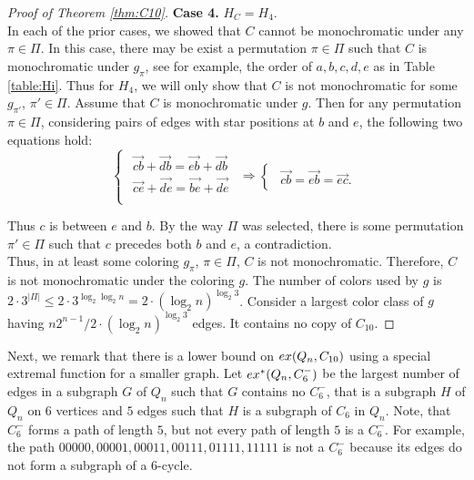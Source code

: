 \documentclass[11pt, a4paper]{article}
\newcommand{\ex}{{\rm  ex}}
\begin{document}
\begin{proof}[Proof of Theorem \ref{thm:C10}]
{\bf Case 4.  } $H_C=H_4$.\\
In each of the prior cases, we showed that $C$ cannot be monochromatic under any $\pi\in\Pi$. In this case, there may be exist a permutation $\pi\in\Pi$ such that $C$ is monochromatic under $g_{\pi}$, see for example, the order of $a,b,c,d,e$ as in Table \ref{table:Hi}. 
Thus for $H_4$, we will only show that $C$ is not monochromatic for some $g_{\pi'}$, $\pi'\in\Pi$.
Assume that $C$ is monochromatic under $g$. Then for any permutation $\pi\in\Pi$, considering pairs of edges with star positions at  $b$ and $e$, the following two equations hold:
 $$
 \begin{cases}
\begin{array}{c}
\overrightarrow{cb}+\overrightarrow{db}=\overrightarrow{eb}+\overrightarrow{db}\\
\overrightarrow{ce}+\overrightarrow{de}=\overrightarrow{be}+\overrightarrow{de}\\
\end{array}
\end{cases}
\Longrightarrow
\begin{cases}
\begin{array}{c}
\overrightarrow{cb}=\overrightarrow{eb}=\overrightarrow{ec}.
\end{array}
\end{cases}$$

Thus  $c$ is between   $e$ and $b$. 
By the way $\Pi$ was selected, there is some permutation $\pi' \in \Pi$ such that $c$ precedes both $b$ and $e$, a contradiction. 
\\




Thus, in at least some coloring $g_\pi$, $\pi\in \Pi$, $C$ is not monochromatic.
Therefore, $C$ is not monochromatic under the coloring $g$. 
The number of colors used by $g$ is $2\cdot 3^{|\Pi|} \leq 2 \cdot 3^{\log_2\log_2 n} = 2\cdot (\log_2 n)^{\log_2 3}$.
Consider a largest color class of $g$ having $n2^{n-1}/ 2\cdot (\log_2 n)^{\log_2 3}$ edges. It contains no copy of $C_{10}$. 
\end{proof}

		
		
	Next, we remark that there is a lower bound on $\ex(Q_n, C_{10})$ using a special extremal function for a smaller graph. 
	Let $\ex^*(Q_n, C_6^-)$ be the largest number of edges in a subgraph $G$ of $Q_n$ such that $G$ contains no $C_6^-$, that is a subgraph  $H$ of $Q_n$ on $6$ vertices and $5$ edges such that $H$ is a subgraph of $C_6$ in $Q_n$. Note, that $C_6^-$ forms a path of length $5$, but not every path of length $5$ is a $C_6^-$. For example, the path $00000, 
00001, 00011, 00111, 01111, 11111$ is not a $C_6^-$ because its edges do not form a subgraph of a $6$-cycle.\\
\end{document}
